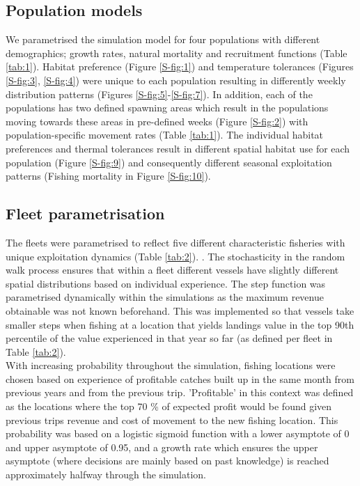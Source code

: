 \documentclass[review]{elsarticle}
\begin{document}
\subsection{Population models}

We parametrised the simulation model for four populations with different
demographics; growth rates, natural mortality and recruitment functions (Table
\ref{tab:1}). Habitat preference (Figure \ref{S-fig:1}) and temperature
tolerances (Figures \ref{S-fig:3}, \ref{S-fig:4}) were unique to each
population resulting in differently weekly distribution patterns (Figures
\ref{S-fig:5}-\ref{S-fig:7}). In addition, each of the populations has two
defined spawning areas which result in the populations moving towards these
areas in pre-defined weeks (Figure \ref{S-fig:2}) with population-specific
movement rates (Table \ref{tab:1}). The individual habitat preferences and
thermal tolerances result in different spatial habitat use for each population
(Figure \ref{S-fig:9}) and consequently different seasonal exploitation
patterns (Fishing mortality in Figure \ref{S-fig:10}). 

\subsection{Fleet parametrisation}

The fleets were parametrised to reflect five different characteristic fisheries
with unique exploitation dynamics (Table \ref{tab:2}).  .  The
stochasticity in the random walk process ensures that within a fleet different
vessels have slightly different spatial distributions based on individual
experience. The step function was parametrised dynamically within the
simulations as the maximum revenue obtainable was not known beforehand. This
was implemented so that vessels take smaller steps when fishing at a location
that yields landings value in the top 90th percentile of the value experienced
in that year so far (as defined per fleet in Table \ref{tab:2}). \\

With increasing probability throughout the simulation, fishing locations were
chosen based on experience of profitable catches built up in the same month
from previous years and from the previous trip. 'Profitable' in this context
was defined as the locations where the top 70 \% of expected profit would be
found given previous trips revenue and cost of movement to the new fishing
location.  This probability was based on a logistic sigmoid function with a
lower asymptote of 0 and upper asymptote of 0.95, and a growth rate which
ensures the upper asymptote (where decisions are mainly based on past
knowledge) is reached approximately halfway through the simulation.  \\
\end{document}
